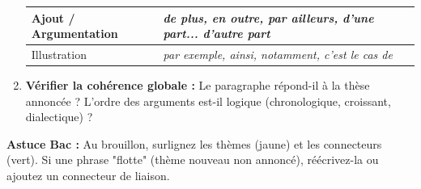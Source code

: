 \documentclass[11pt]{article}
\begin{document}
\begin{methode}
\begin{enumerate}
\begin{center}
\begin{tabularx}{\linewidth}{|l|X|}
            Ajout / Argumentation & \emph{de plus, en outre, par ailleurs, d'une part... d'autre part} \\ \hline
            Illustration & \emph{par exemple, ainsi, notamment, c'est le cas de} \\ \hline
            \end{tabularx}
            \end{center}
        \item \textbf{Vérifier la cohérence globale :} Le paragraphe répond-il à la thèse annoncée ? L'ordre des arguments est-il logique (chronologique, croissant, dialectique) ?
    \end{enumerate}
    \textbf{Astuce Bac :} Au brouillon, surlignez les thèmes (jaune) et les connecteurs (vert). Si une phrase "flotte" (thème nouveau non annoncé), réécrivez-la ou ajoutez un connecteur de liaison.
\end{methode}
\end{document}
